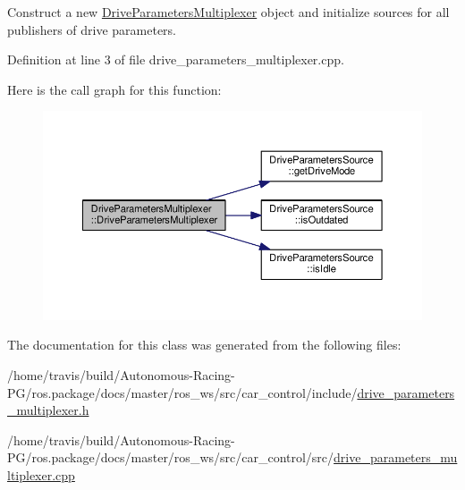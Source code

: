 Construct a new \hyperlink{class_drive_parameters_multiplexer}{Drive\+Parameters\+Multiplexer} object and initialize sources for all publishers of drive parameters. 



Definition at line 3 of file drive\+\_\+parameters\+\_\+multiplexer.\+cpp.



Here is the call graph for this function\+:
\nopagebreak
\begin{figure}[H]
\begin{center}
\leavevmode
\includegraphics[width=350pt]{class_drive_parameters_multiplexer_a00fd5b0e6d1d76fce05212c78310bebc_cgraph}
\end{center}
\end{figure}




The documentation for this class was generated from the following files\+:\begin{DoxyCompactItemize}
\item 
/home/travis/build/\+Autonomous-\/\+Racing-\/\+P\+G/ros.\+package/docs/master/ros\+\_\+ws/src/car\+\_\+control/include/\hyperlink{drive__parameters__multiplexer_8h}{drive\+\_\+parameters\+\_\+multiplexer.\+h}\item 
/home/travis/build/\+Autonomous-\/\+Racing-\/\+P\+G/ros.\+package/docs/master/ros\+\_\+ws/src/car\+\_\+control/src/\hyperlink{drive__parameters__multiplexer_8cpp}{drive\+\_\+parameters\+\_\+multiplexer.\+cpp}\end{DoxyCompactItemize}
